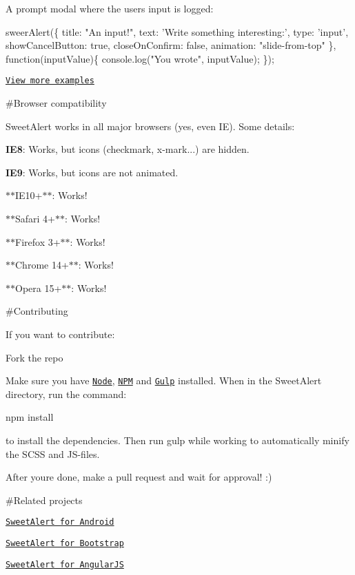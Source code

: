 A prompt modal where the user\textquotesingle{}s input is logged\+:


\begin{DoxyCode}
sweerAlert(\{
  title: "An input!",
  text: 'Write something interesting:',
  type: 'input',
  showCancelButton: true,
  closeOnConfirm: false,
  animation: "slide-from-top"
\}, function(inputValue)\{
  console.log("You wrote", inputValue);   
\});
\end{DoxyCode}


\href{http://tristanedwards.me/sweetalert}{\tt View more examples}

\#\+Browser compatibility

Sweet\+Alert works in all major browsers (yes, even IE). Some details\+:


\begin{DoxyItemize}
\item {\bfseries I\+E8}\+: Works, but icons (checkmark, x-\/mark...) are hidden.
\item {\bfseries I\+E9}\+: Works, but icons are not animated.
\item $\ast$$\ast$\+I\+E10+$\ast$$\ast$\+: Works!
\item $\ast$$\ast$\+Safari 4+$\ast$$\ast$\+: Works!
\item $\ast$$\ast$\+Firefox 3+$\ast$$\ast$\+: Works!
\item $\ast$$\ast$\+Chrome 14+$\ast$$\ast$\+: Works!
\item $\ast$$\ast$\+Opera 15+$\ast$$\ast$\+: Works!
\end{DoxyItemize}

\#\+Contributing

If you want to contribute\+:


\begin{DoxyItemize}
\item Fork the repo
\item Make sure you have \href{http://nodejs.org/}{\tt Node}, \href{https://www.npmjs.com/}{\tt N\+PM} and \href{http://gulpjs.com/}{\tt Gulp} installed. When in the Sweet\+Alert directory, run the command\+: 
\begin{DoxyCode}
npm install
\end{DoxyCode}
 to install the dependencies. Then run {\ttfamily gulp} while working to automatically minify the S\+C\+SS and J\+S-\/files.
\item After you\textquotesingle{}re done, make a pull request and wait for approval! \+:)
\end{DoxyItemize}

\#\+Related projects


\begin{DoxyItemize}
\item \href{https://github.com/pedant/sweet-alert-dialog}{\tt Sweet\+Alert for Android}
\item \href{https://github.com/lipis/bootstrap-sweetalert}{\tt Sweet\+Alert for Bootstrap}
\item \href{https://github.com/oitozero/ngSweetAlert}{\tt Sweet\+Alert for Angular\+JS} 
\end{DoxyItemize}